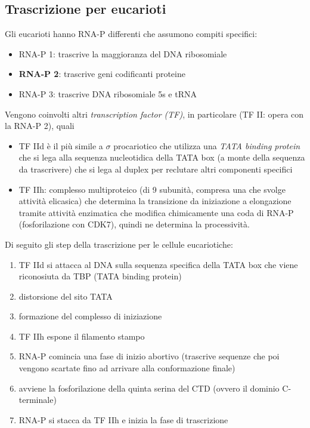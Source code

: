     \subsection{Trascrizione per eucarioti}
        Gli eucarioti hanno RNA-P differenti che assumono compiti specifici:
        \begin{itemize}
            \item RNA-P 1: trascrive la maggioranza del DNA ribosomiale 
            \item \textbf{RNA-P 2}: trascrive geni codificanti proteine 
            \item RNA-P 3: trascrive DNA ribosomiale 5s e tRNA
        \end{itemize}
        Vengono coinvolti altri \textit{transcription factor (TF)}, in particolare (TF II: opera con la RNA-P 2), quali 
        \begin{itemize} 
            \item TF IId è il più simile a $\sigma$ procariotico che utilizza una \textit{TATA binding protein} che si lega alla sequenza nucleotidica della TATA box (a monte della sequenza da trascrivere) che si lega al duplex per reclutare altri componenti specifici
            \item TF IIh: complesso multiproteico (di 9 subunità, compresa una che svolge attività elicasica) che determina la transizione da iniziazione a elongazione tramite attività enzimatica che modifica chimicamente una coda di RNA-P (fosforilazione con CDK7), quindi ne determina la processività.
        \end{itemize}
        Di seguito gli step della trascrizione per le cellule eucariotiche:
        \begin{enumerate}
            \item TF IId si attacca al DNA sulla sequenza specifica della TATA box che viene riconosiuta da TBP (TATA binding protein)
            \item distorsione del sito TATA
            \item formazione del complesso di iniziazione
            \item TF IIh espone il filamento stampo
            \item RNA-P comincia una fase di inizio abortivo (trascrive sequenze che poi vengono scartate fino ad arrivare alla conformazione finale)
            \item avviene la fosforilazione della quinta serina del CTD (ovvero il dominio C-terminale)
            \item RNA-P si stacca da TF IIh e inizia la fase di trascrizione
        \end{enumerate}
